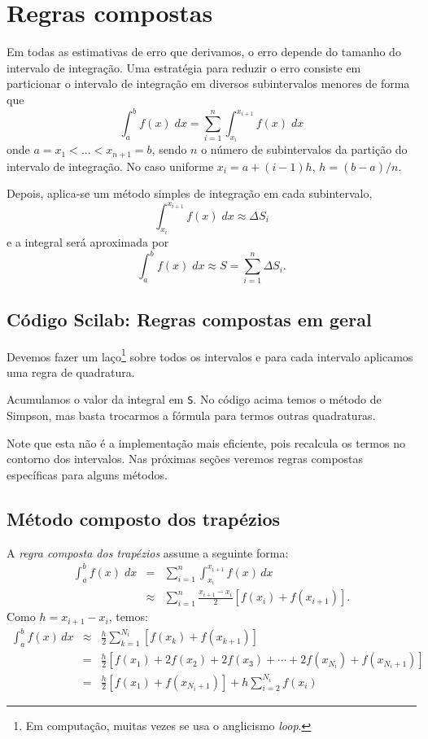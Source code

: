 \section{Regras compostas}

Em todas as estimativas de erro que derivamos, o erro depende do tamanho do intervalo de integração. Uma estratégia para reduzir o erro consiste em particionar o intervalo de integração em diversos subintervalos menores de forma que
\begin{equation*}
\int_{a}^b f(x)\;dx=\sum_{i=1}^{n} \int_{x_i}^{x_{i+1}} f(x)\;dx
\end{equation*}
onde $a=x_1<...<x_{n+1}=b$, sendo $n$ o número de subintervalos da partição do intervalo de integração. No caso uniforme $x_i = a + (i-1)h$, $h = (b-a)/n$.

Depois, aplica-se um método simples de integração em cada subintervalo,
$$
\int_{x_i}^{x_{i+1}} f(x)\;dx \approx \Delta S_i
$$
e a integral será aproximada por
$$
\int_a^b f(x)\;dx \approx S= \sum_{i=1}^{n} \Delta S_i.
$$

\ifisscilab
\subsection{Código Scilab: Regras compostas em geral}
Devemos fazer um laço\footnote{Em computação, muitas vezes se usa o anglicismo {\it loop}.} sobre todos os intervalos e para cada intervalo aplicamos uma regra de quadratura.



Acumulamos o valor da integral em \verb+S+. No código acima temos o método de Simpson, mas basta trocarmos a fórmula para termos outras quadraturas.

Note que esta não é a implementação mais eficiente, pois recalcula os termos no contorno dos intervalos. Nas próximas seções veremos regras compostas específicas para alguns métodos.
\fi

\subsection{Método composto dos trapézios}
A \emph{regra composta dos trapézios} assume a seguinte forma:
\begin{eqnarray*}
  \int_{a}^b f(x)\;dx &=& \sum_{i=1}^{n} \int_{x_i}^{x_{i+1}}f(x)\,dx \\
  &\approx& \sum_{i=1}^{n} \frac{x_{i+1}-x_i}{2}\left[f(x_i)+f(x_{i+1})\right].
\end{eqnarray*}
Como $h = x_{i+1} - x_i$, temos:
\begin{eqnarray*}
\int_{a}^b f(x)\,dx &\approx& \frac{h}{2}\sum_{k=1}^{N_i}\left[f(x_k)+f(x_{k+1})\right]\\
&=& \frac{h}{2}\left[f(x_1)+2f(x_2)+2f(x_3)+\cdots + 2f(x_{N_i})+f(x_{N_i+1})\right]\\
&=& \frac{h}{2}\left[f(x_1) + f(x_{N_i+1})\right] + h\sum_{i=2}^{N_i} f(x_i)
\end{eqnarray*}


